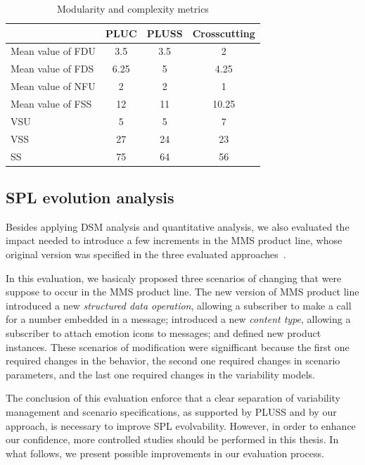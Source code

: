 \documentclass[times, 11pt,twocolumn]{article}
\begin{document}
\begin{table}[htb]
\centering
\caption{Modularity and complexity metrics}
\label{tab:metrics}
\begin{small}
\begin{tabular}{lccc} \hline
					    & PLUC 	& PLUSS 	& Crosscutting	\\ \hline
Mean value of FDU 		& 3.5	& 3.5	& 2					\\
Mean value of FDS 		& 6.25	& 5		& 4.25				\\
Mean value of NFU 		& 2		& 2		& 1					\\
Mean value of FSS 		& 12	& 11	& 10.25				\\ 
VSU 					& 5		& 5		& 7					\\
VSS 					& 27	& 24	& 23				\\
SS 					    & 75	& 64	& 56				\\	\hline
\end{tabular}
\end{small}
\end{table}

\subsection{SPL evolution analysis}\label{sub:increments}

Besides applying DSM analysis and
quantitative analysis, we also evaluated the impact needed to introduce a few
increments in the MMS product line, whose original version was specified in the
three evaluated approaches~\cite{Bonifacio:2008aa}. 

In this evaluation, we basicaly proposed three scenarios of changing that were
suppose to occur in the MMS product line. The new version of MMS product line 
introduced a new \emph{structured data operation}, allowing a subscriber to make
a call for a number embedded in a message; introduced a new
\emph{content type}, allowing a subscriber to attach emotion icons
to messages; and defined new product instances. These scenarios of modification
were signifficant because the first one required changes in the behavior,
the second one required changes in scenario parameters, and the last one
required changes in the variability models. 

The conclusion of this evaluation enforce that a clear separation of
variability management and scenario specifications, as supported by PLUSS and by
our approach, is necessary to improve SPL evolvability. However, in order to
enhance our confidence, more controlled studies should be performed in this
thesis. In what follows, we present possible improvements in our evaluation
process. 
\end{document}

